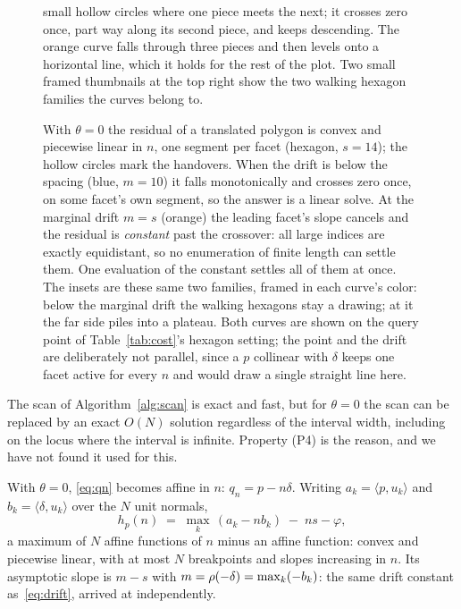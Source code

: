 \begin{figure}[t]
{  small hollow circles where one piece meets the next; it crosses zero once, part
  way along its second piece, and keeps descending. The orange curve falls through
  three pieces and then levels onto a horizontal line, which it holds for the rest
  of the plot. Two small framed thumbnails at the top right show the two walking
  hexagon families the curves belong to.}
  \caption{With $\theta=0$ the residual of a translated polygon is convex and
  piecewise linear in $n$, one segment per facet (hexagon, $s=14$); the hollow
  circles mark the handovers. When the drift is below the spacing (blue, $m=10$)
  it falls monotonically and crosses zero once, on some facet's own segment, so
  the answer is a linear solve. At the marginal drift $m=s$ (orange) the leading
  facet's slope cancels and the residual is \emph{constant} past the crossover:
  all large indices are exactly equidistant, so no enumeration of finite length
  can settle them. One evaluation of the constant settles all of them at once.
  The insets are these same two families, framed in each curve's color: below the
  marginal drift the walking hexagons stay a drawing; at it the far side piles
  into a plateau. Both curves are shown on the query point of
  Table~\ref{tab:cost}'s hexagon setting; the point and the drift are deliberately
  not parallel, since a $p$ collinear with $\delta$ keeps one facet active for
  every $n$ and would draw a single straight line here.}
  \label{fig:convex}
\end{figure}

The scan of Algorithm~\ref{alg:scan} is exact and fast, but for $\theta=0$ the
scan can be replaced by an exact $O(N)$ solution regardless of the interval
width, including on the locus where the interval is infinite. Property (P4) is the reason,
and we have not found it used for this.

With $\theta=0$, \eqref{eq:qn} becomes affine in $n$: $q_n = p - n\delta$. Writing
$a_k = \langle p, u_k\rangle$ and $b_k = \langle \delta, u_k\rangle$ over the $N$
unit normals,
\begin{equation}
  h_p(n) \;=\; \max_{k}\,(a_k - n b_k) \;-\; ns - \varphi ,
  \label{eq:convex}
\end{equation}
a maximum of $N$ affine functions of $n$ minus an affine function: convex and
piecewise linear, with at most $N$ breakpoints and slopes increasing in $n$. Its
asymptotic slope is $m - s$ with $m=\rho(-\delta)=\max_k(-b_k)$: the same drift
constant as~\eqref{eq:drift}, arrived at independently.

